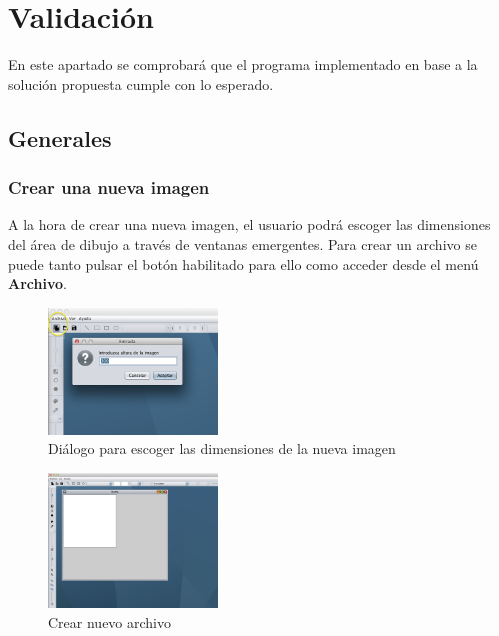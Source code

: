 \section{Validación}
En este apartado se comprobará que el programa implementado en base a la solución propuesta cumple con lo esperado.
\subsection{Generales}
\subsubsection{Crear una nueva imagen}
A la hora de crear una nueva imagen, el usuario podrá escoger las dimensiones del área de dibujo a través de ventanas emergentes. Para crear un archivo se puede tanto pulsar el botón habilitado para ello como acceder desde el menú \textbf{Archivo}.
\vskip0.3cm
\begin{figure}[H]
 \centering
  \includegraphics[width=0.4\textwidth]{generales/altura.png}
 \caption{Diálogo para escoger las dimensiones de la nueva imagen}
 \label{diseño}
 \end{figure}
\begin{figure}[H]
 \centering
  \includegraphics[width=0.4\textwidth]{generales/nuevo.png}
 \caption{Crear nuevo archivo}
 \label{diseño}
 \end{figure}

